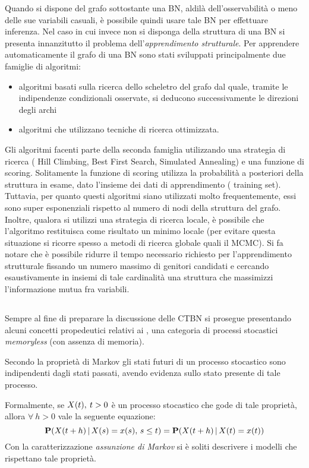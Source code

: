Quando si dispone del grafo sottostante una \acs{BN}, aldilà dell'osservabilità o meno delle sue variabili casuali, è possibile quindi usare tale \acs{BN} per effettuare inferenza. Nel caso in cui invece non si disponga della struttura di una \acs{BN} si presenta innanzitutto il problema dell'\emph{apprendimento strutturale}. Per apprendere automaticamente il grafo di una \acl{BN} sono stati sviluppati principalmente due famiglie di algoritmi:
\begin{itemize}
    \item algoritmi basati sulla ricerca dello scheletro del grafo dal quale, tramite le indipendenze condizionali osservate, si deducono successivamente le direzioni degli archi
    \item algoritmi che utilizzano tecniche di ricerca ottimizzata.
\end{itemize}
Gli algoritmi facenti parte della seconda famiglia utilizzando una strategia di ricerca (\eg{} Hill Climbing, Best First Search, Simulated Annealing) e una funzione di scoring. Solitamente la funzione di scoring utilizza la probabilità a posteriori della struttura in esame, dato l'insieme dei dati di apprendimento (\ie{} training set). Tuttavia, per quanto questi algoritmi siano utilizzati molto frequentemente, essi sono super esponenziali rispetto al numero di nodi della struttura del grafo. Inoltre, qualora si utilizzi una strategia di ricerca locale, è possibile che l'algoritmo restituisca come risultato un minimo locale (per evitare questa situazione si ricorre spesso a metodi di ricerca globale quali il \acs{MCMC}). Si fa notare che è possibile ridurre il tempo necessario richiesto per l'apprendimento strutturale fissando un numero massimo di genitori candidati e cercando esaustivamente in insiemi di tale cardinalità una struttura che massimizzi l'informazione mutua fra variabili.

\subsection{\mprocess}
\label{sec:mps}

Sempre al fine di preparare la discussione delle \acl{CTBN} si prosegue presentando alcuni concetti propedeutici relativi ai \mprocess{}, una categoria di processi stocastici \emph{memoryless} (con assenza di memoria).

\begin{definizione}
\label{defn:markov-assumption}
Secondo la proprietà di Markov gli stati futuri di un processo stocastico sono indipendenti dagli stati passati, avendo evidenza sullo stato presente di tale processo.

Formalmente, se $\mathnormal{X}(t),\:t > 0$ è un processo stocastico che gode di tale proprietà, allora $\forall\:h > 0$ vale la seguente equazione:
\begin{equation}
\label{eq:markov-assumption}
\mathbf{P}(\mathnormal{X}(t + h)\,\arrowvert\,\mathnormal{X}(s)=x(s),\,s\leq t)=\mathbf{P}(\mathnormal{X}(t + h)\,\arrowvert\,\mathnormal{X}(t)=x(t))
\end{equation}
Con la caratterizzazione \emph{assunzione di Markov} si è soliti descrivere i modelli che rispettano tale proprietà.
\end{definizione}

